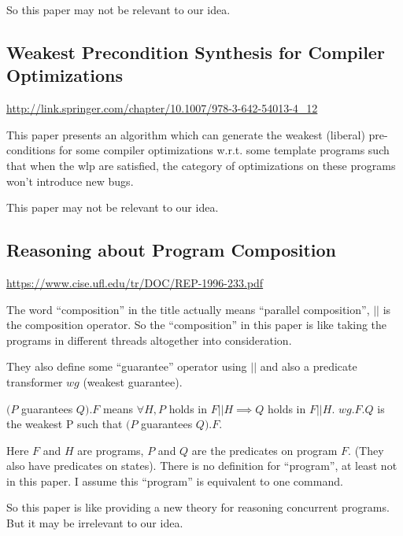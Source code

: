 \documentclass[12pt, fleqn]{article}
\begin{document}
So this paper may not be relevant to our idea.


\subsection{Weakest Precondition Synthesis for Compiler Optimizations}

\url{http://link.springer.com/chapter/10.1007/978-3-642-54013-4_12}

\bigskip

This paper presents an algorithm which can generate the weakest
(liberal) pre-conditions for some compiler optimizations w.r.t. some
template programs such that when the wlp are satisfied, the category
of optimizations on these programs won't introduce new bugs.

This paper may not be relevant to our idea.


\subsection{Reasoning about Program Composition}

\url{https://www.cise.ufl.edu/tr/DOC/REP-1996-233.pdf}

\bigskip

The word ``composition'' in the title actually means ``parallel
composition'', $||$ is the composition operator. So the
``composition'' in this paper is like taking the programs in different
threads altogether into consideration.

They also define some ``guarantee'' operator using $||$ and also a
predicate transformer $wg$ (weakest guarantee).

$(P$ guarantees $Q).F$ means $\forall H, P$ holds in $F || H \implies
Q$ holds in $F || H$. $wg.F.Q$ is the weakest P such that $(P$
guarantees $Q).F$.

Here $F$ and $H$ are programs, $P$ and $Q$ are the predicates on
program $F$. (They also have predicates on states). There is no
definition for ``program'', at least not in this paper. I assume this
``program'' is equivalent to one command.

So this paper is like providing a new theory for reasoning concurrent
programs. But it may be irrelevant to our idea.

\end{document}
